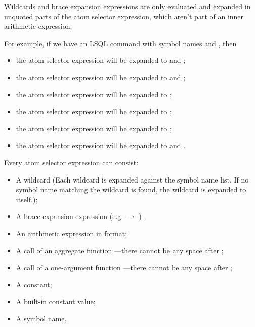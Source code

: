 Wildcards and brace expansion expressions are only evaluated and expanded in unquoted parts of the atom selector expression, which aren't part of an inner arithmetic expression.

For example, if we have an LSQL command with symbol names  and , then 
\begin{itemize}
    \item the atom selector expression  will be expanded to  and ;
    \item the atom selector expression  will be expanded to  and ;
    \item the atom selector expression  will be expanded to ;
    \item the atom selector expression  will be expanded to ;
    \item the atom selector expression  will be expanded to ;
    \item the atom selector expression  will be expanded to  and .
\end{itemize}

Every atom selector expression can consist:
\begin{itemize}
    \item A wildcard (Each wildcard is expanded against the symbol name list.
	    If no symbol name matching the wildcard is found, the wildcard is expanded to itself.);
    \item A  brace expansion expression (e.g.  $\rightarrow$ ) \cite{bash-reference-manual};
    \item An arithmetic expression in  format;
    \item A call of an aggregate function ---\allowbreak{}the\-re cannot be any space after ;
    \item A call of a one-argument function ---there cannot be any space after ;
    \item A constant;
    \item A built-in constant value;
    \item A symbol name.
\end{itemize}

